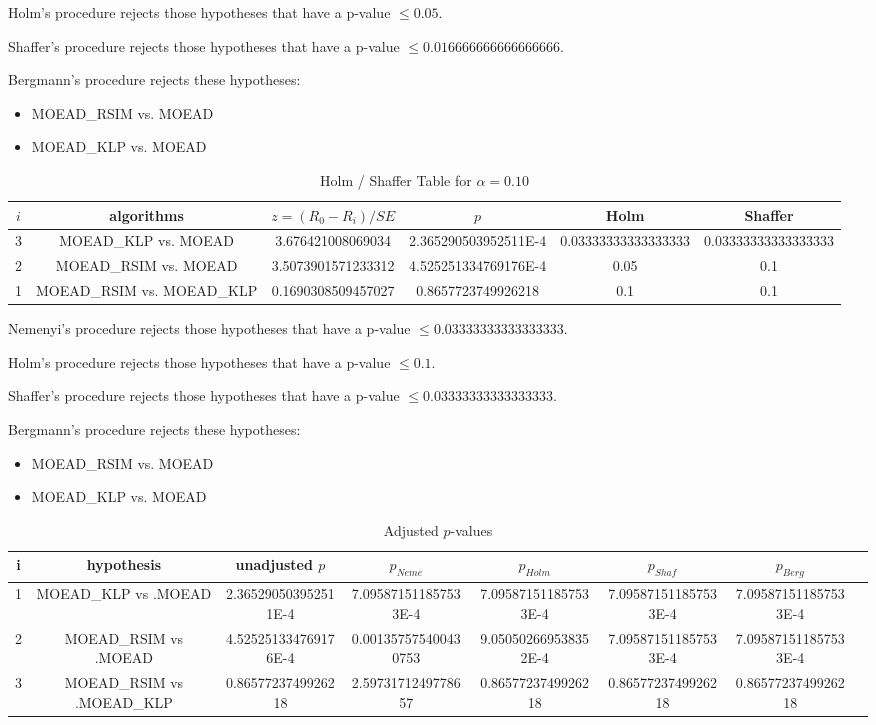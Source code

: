 \documentclass[a4paper,10pt]{article}
\begin{document}
\begin{landscape}
Holm's procedure rejects those hypotheses that have a p-value $\le0.05$.


Shaffer's procedure rejects those hypotheses that have a p-value $\le0.016666666666666666$.


Bergmann's procedure rejects these hypotheses:


\begin{itemize}


\item MOEAD_RSIM vs. MOEAD
\item MOEAD_KLP vs. MOEAD
\end{itemize}


\begin{table}[!htp]
\centering\tiny
\caption{Holm / Shaffer Table for $\alpha=0.10$}
\begin{tabular}{cccccc}
$i$&algorithms&$z=(R_0 - R_i)/SE$&$p$&Holm&Shaffer\\
\hline
3&MOEAD_KLP vs. MOEAD&3.676421008069034&2.365290503952511E-4&0.03333333333333333&0.03333333333333333\\
2&MOEAD_RSIM vs. MOEAD&3.5073901571233312&4.525251334769176E-4&0.05&0.1\\
1&MOEAD_RSIM vs. MOEAD_KLP&0.1690308509457027&0.8657723749926218&0.1&0.1\\
\hline
\end{tabular}
\end{table}
Nemenyi's procedure rejects those hypotheses that have a p-value $\le0.03333333333333333$.


Holm's procedure rejects those hypotheses that have a p-value $\le0.1$.


Shaffer's procedure rejects those hypotheses that have a p-value $\le0.03333333333333333$.


Bergmann's procedure rejects these hypotheses:


\begin{itemize}


\item MOEAD_RSIM vs. MOEAD
\item MOEAD_KLP vs. MOEAD
\end{itemize}


\begin{table}[!htp]
\centering\tiny
\caption{Adjusted $p$-values}
\begin{tabular}{cccccccc}
i&hypothesis&unadjusted $p$&$p_{Neme}$&$p_{Holm}$&$p_{Shaf}$&$p_{Berg}$\\
\hline
1&MOEAD_KLP vs .MOEAD&2.365290503952511E-4&7.095871511857533E-4&7.095871511857533E-4&7.095871511857533E-4&7.095871511857533E-4\\
2&MOEAD_RSIM vs .MOEAD&4.525251334769176E-4&0.001357575400430753&9.050502669538352E-4&7.095871511857533E-4&7.095871511857533E-4\\
3&MOEAD_RSIM vs .MOEAD_KLP&0.8657723749926218&2.5973171249778657&0.8657723749926218&0.8657723749926218&0.8657723749926218\\
\hline
\end{tabular}
\end{table}

\end{landscape}
\end{document}
